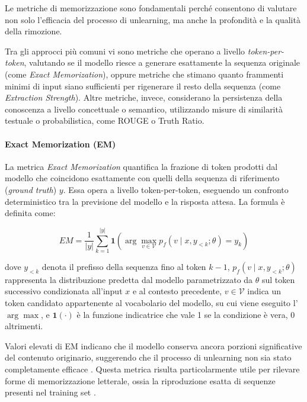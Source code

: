 Le metriche di memorizzazione sono fondamentali perché consentono di valutare non solo l’efficacia del processo di unlearning, ma anche la profondità e la qualità della rimozione.

Tra gli approcci più comuni vi sono metriche che operano a livello \textit{token-per-token}, valutando se il modello riesce a generare esattamente la sequenza originale (come \textit{Exact Memorization}), oppure metriche che stimano quanto frammenti minimi di input siano sufficienti per rigenerare il resto della sequenza (come \textit{Extraction Strength}). Altre metriche, invece, considerano la persistenza della conoscenza a livello concettuale o semantico, utilizzando misure di similarità testuale o probabilistica, come ROUGE o Truth Ratio.

\paragraph{Exact Memorization (EM)}

La metrica \textit{Exact Memorization} quantifica la frazione di token prodotti dal modello che 
coincidono esattamente con quelli della sequenza di riferimento (\textit{ground truth}) \( y \).
Essa opera a livello token-per-token, eseguendo un confronto deterministico tra la previsione 
del modello e la risposta attesa. 
La formula è definita come:

\[
EM = \frac{1}{|y|} \sum_{k=1}^{|y|}
\mathbf{1}\!\left(
\arg\max_{v \in \mathcal{V}} p_f(v \mid x, y_{<k}; \theta) = y_k
\right)
\]

dove \( y_{<k} \) denota il prefisso della sequenza fino al token \( k-1 \), 
\( p_f(v \mid x, y_{<k}; \theta) \) rappresenta la distribuzione predetta dal modello parametrizzato 
da \( \theta \) sul token successivo condizionata all'input \( x \) e al contesto precedente, 
\( v \in \mathcal{V} \) indica un token candidato appartenente al vocabolario del modello, su cui 
viene eseguito l'\(\arg\max\), 
e \( \mathbf{1}(\cdot) \) è la funzione indicatrice che vale 1 se la condizione è vera, 0 altrimenti.

Valori elevati di EM indicano che il modello conserva ancora porzioni significative del contenuto 
originario, suggerendo che il processo di unlearning non sia stato completamente efficace 
\cite{tirumala2022memorizationoverfittinganalyzingtraining}.  
Questa metrica risulta particolarmente utile per rilevare forme di memorizzazione letterale,
ossia la riproduzione esatta di sequenze presenti nel training set \cite{274574}.

